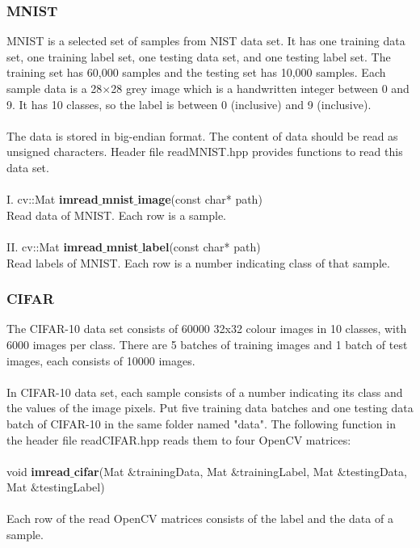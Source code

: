 \documentclass[12pt]{article}
\begin{document}
\subsubsection{MNIST}
MNIST is a selected set of samples from NIST data set. It has one training data set, one training label set, one testing data set, and one testing label set. The training set has 60,000 samples and the testing set has 10,000 samples. Each sample data is a 28$\times$28 grey image which is a handwritten integer between 0 and 9. It has 10 classes, so the label is between 0 (inclusive) and 9 (inclusive).\\
\\
The data is stored in big-endian format. The content of data should be read as unsigned characters. Header file readMNIST.hpp provides functions to read this data set.\\
\\
I. cv::Mat \textbf{imread$\_$mnist$\_$image}(const char* path)\\
Read data of MNIST. Each row is a sample.\\
\\
II. cv::Mat \textbf{imread$\_$mnist$\_$label}(const char* path)\\
Read labels of MNIST. Each row is a number indicating class of that sample.
\subsubsection{CIFAR}
The CIFAR-10 data set consists of 60000 32x32 colour images in 10 classes, with 6000 images per class. There are 5 batches of training images and 1 batch of test images, each consists of 10000 images.\\
\\
In CIFAR-10 data set, each sample consists of a number indicating its class and the values of the image pixels. Put five training data batches and one testing data batch of CIFAR-10 in the same folder named "data". The following function in the header file readCIFAR.hpp reads them to four OpenCV matrices:\\
\\
void \textbf{imread$\_$cifar}(Mat $\&$trainingData, Mat $\&$trainingLabel, Mat $\&$testingData, Mat $\&$testingLabel)\\
\\
Each row of the read OpenCV matrices consists of the label and the data of a sample.
\end{document}
